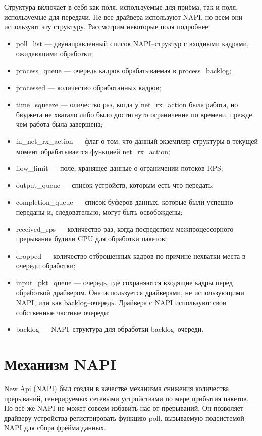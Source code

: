 Структура включает в себя как поля, используемые для приёма, так и поля, используемые для передачи. Не все драйвера используют NAPI, но всем они используют эту структуру. Рассмотрим некоторые поля подробнее:
\begin{itemize}[label=---]
	\item poll\_list --- двунаправленный список NAPI--структур с входными кадрами, ожидающими обработки;
	\item process\_queue --- очередь кадров обрабатываемая в process\_backlog;
	\item processed --- количество обработанных кадров;
	\item time\_squeeze --- оличество раз, когда у net\_rx\_action была работа, но бюджета не хватало либо было достигнуто ограничение по времени, прежде чем работа была завершена;
	\item in\_net\_rx\_action --- флаг о том, что данный экземпляр структуры в текущей момент обрабатывается функцией  net\_rx\_action;
	\item flow\_limit --- поле, хранящее данные о ограничении потоков RPS;
	\item output\_queue --- список устройств, которым есть что передать;
	\item completion\_queue --- список буферов данных, которые были успешно переданы и, следовательно, могут быть освобождены;
	\item received\_rps --- количество раз, когда посредством межпроцессорного прерывания будили CPU для обработки пакетов;
	\item dropped --- количество отброшенных кадров по причине нехватки места в очереди обработки;
	\item input\_pkt\_queue --- очередь, где сохраняются входящие кадры перед обработкой драйвером. Она используется драйверами, не использующими NAPI, или как backlog--очередь. Драйвера с NAPI используют свои собственные частные очереди;
	\item backlog --- NAPI--структура для обработки backlog--очереди.
\end{itemize}

\section{Механизм NAPI}

New Api (NAPI) был создан в качестве механизма снижения количества прерываний, генерируемых сетевыми устройствами по мере прибытия пакетов. Но всё же NAPI не может совсем избавить нас от прерываний. Он позволяет драйверу устройства регистрировать функцию poll, вызываемую подсистемой NAPI для сбора фрейма данных.

